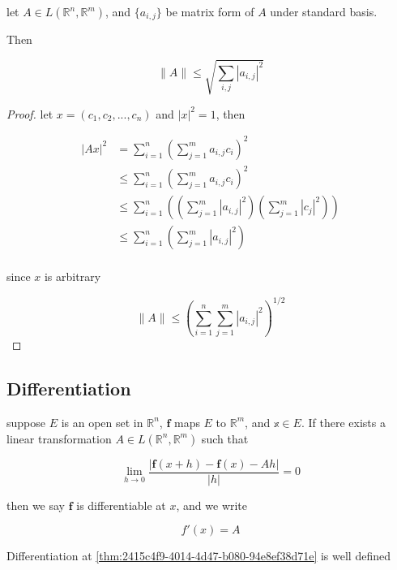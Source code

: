 \begin{thm}
    let $A \in L(\mathbb{R}^n, \mathbb{R}^m)$, and $\{ a_{i,j}\}$ be matrix form of $A$ 
    under standard basis.

    Then

    \[
        \| A \| \le \sqrt{\sum_{i,j} \left|a_{i,j} \right|^2}
    \]
\end{thm}

\begin{proof}
    let $x = (c_1,c_2,...,c_n)$ and $|x|^2 = 1$, then

    \begin{align*}
        \left| A x \right|^2 &= \sum_{i=1}^{n} \left( \sum_{j=1}^{m} a_{i,j}c_i \right)^2 \\
        & \le \sum_{i=1}^{n} \left( \sum_{j=1}^{m} a_{i,j}c_i \right)^2 \\
        & \le \sum_{i=1}^{n} \left( \left(\sum_{j=1}^{m} \left|a_{i,j} \right|^2\right) \left(\sum_{j=1}^{m} \left|c_j \right|^2\right) \right) \\
        & \le \sum_{i=1}^{n} \left(\sum_{j=1}^{m} \left|a_{i,j} \right|^2\right)   \\
    \end{align*}

    since $x$ is arbitrary

    \[
\| A \| \le \left(\sum_{i=1}^{n} \sum_{j=1}^{m} \left|a_{i,j} \right|^2 \right)^{1/2}
    \]
\end{proof}

\subsection{Differentiation}

\begin{definition}
    \label{thm:2415c4f9-4014-4d47-b080-94e8ef38d71e}
    suppose $E$ is an open set in $\mathbb{R}^n$, $\mathbf{f}$ maps $E$ to $\mathbb{R}^m$, and $\mathbb{x} \in E$.
    If there exists a linear transformation $A \in L(\mathbb{R}^n, \mathbb{R}^m)$ such that

    \[
        \lim_{h \to 0} \frac{\left| \mathbf{f}(x + h) - \mathbf{f}(x) - Ah \right|}{\left| h \right|} = 0
    \]

    then we say $\mathbf{f}$ is differentiable at $x$, and we write

    \[
        f'(x) = A
    \]
\end{definition}

\begin{thm}
    Differentiation at \autoref{thm:2415c4f9-4014-4d47-b080-94e8ef38d71e} is well defined
\end{thm}

